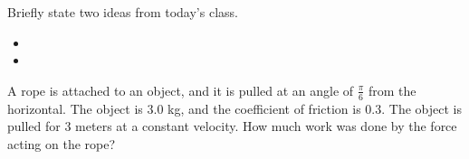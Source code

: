 \postClass

\begin{problem}
\item Briefly state two ideas from today's class.
  \begin{itemize}
  \item 
  \item 
  \end{itemize}
\item 
  \begin{subproblem}
    \item
  \end{subproblem}
\end{problem}



\begin{problem}
\item A rope is attached to an object, and it is pulled at an angle of
  $\frac{\pi}{6}$ from the horizontal. The object is 3.0 kg, and the
  coefficient of friction is 0.3. The object is pulled for 3 meters at
  a constant velocity. How much work was done by the force acting on
  the rope?

  \vfill
\end{problem}


